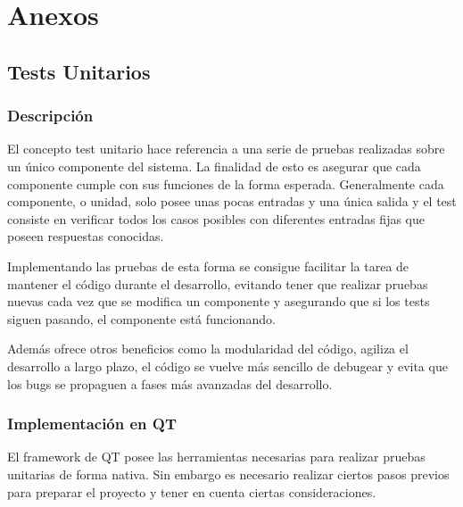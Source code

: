 
\pagestyle{fancy}
\fancyhead[LE,RO]{\thepage}
\fancyhead[LO]{\nouppercase{\rightmark}}

\chapter{Anexos}

\minitoc

\section{Tests Unitarios}

\subsection{Descripción}

El concepto test unitario hace referencia a una serie de pruebas realizadas sobre un único componente del sistema. La finalidad de esto es asegurar que cada componente cumple con sus funciones de la forma esperada. Generalmente cada componente, o unidad, solo posee unas pocas entradas y una única salida y el test consiste en verificar todos los casos posibles con diferentes entradas fijas que poseen respuestas conocidas.

Implementando las pruebas de esta forma se consigue facilitar la tarea de mantener el código durante el desarrollo, evitando tener que realizar pruebas nuevas cada vez que se modifica un componente y asegurando que si los tests siguen pasando, el componente está funcionando.

Además ofrece otros beneficios como la modularidad del código, agiliza el desarrollo a largo plazo, el código se vuelve más sencillo de debugear y evita que los bugs se propaguen a fases más avanzadas del desarrollo.

\subsection{Implementación en QT}

El framework de QT posee las herramientas necesarias para realizar pruebas unitarias de forma nativa. Sin embargo es necesario realizar ciertos pasos previos para preparar el proyecto y tener en cuenta ciertas consideraciones.

